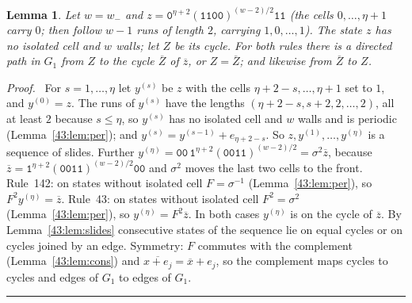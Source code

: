 \documentclass[10pt,a4paper]{article}
\newtheorem{lemma}[theorem]{Lemma}
\newcommand{\qedmark}{\rule{1.1ex}{1.1ex}}
\newenvironment{proof}[1][Proof]{\par\smallskip\noindent\textit{#1.}\ }{\hfill\qedmark\par\smallskip}
\newcommand{\cpl}[1]{\overline{#1}}           %
\newcommand{\Gone}{G_1}                       %
\newcommand{\code}[1]{\mathtt{#1}}            %
\begin{document}
\begin{lemma}\label{43:lem:Z}
Let $w=w_-$ and
$z=\code{0}^{\eta+2}(\code{1100})^{(w-2)/2}\code{11}$ (the cells $0,\dots,\eta+1$ carry $0$; then follow $w-1$
runs of length $2$, carrying $1,0,\dots,1$). The state $z$ has no isolated cell and $w$ walls; let $Z$ be its
cycle. For both rules there is a directed path in $\Gone$ from $Z$ to the cycle $\cpl{Z}$ of $\cpl{z}$, or
$Z=\cpl{Z}$; and likewise from $\cpl{Z}$ to $Z$.
\end{lemma}
\begin{proof}
For $s=1,\dots,\eta$ let $y^{(s)}$ be $z$ with the cells $\eta+2-s,\dots,\eta+1$ set to $1$, and $y^{(0)}=z$. The
runs of $y^{(s)}$ have the lengths $(\eta+2-s,s+2,2,\dots,2)$, all at least $2$ because $s\le\eta$, so $y^{(s)}$
has no isolated cell and $w$ walls and is periodic (Lemma~\ref{43:lem:per}); and
$y^{(s)}=y^{(s-1)}+e_{\eta+2-s}$. So $z,y^{(1)},\dots,y^{(\eta)}$ is a sequence of slides. Further
$y^{(\eta)}=\code{00}\,\code{1}^{\eta+2}(\code{0011})^{(w-2)/2}=\sigma^2\cpl{z}$, because
$\cpl{z}=\code{1}^{\eta+2}(\code{0011})^{(w-2)/2}\code{00}$ and $\sigma^2$ moves the last two cells to the
front. Rule~142: on states without isolated cell $F=\sigma^{-1}$ (Lemma~\ref{43:lem:per}), so
$F^2y^{(\eta)}=\cpl{z}$. Rule~43: on states without isolated cell $F^2=\sigma^2$ (Lemma~\ref{43:lem:per}), so
$y^{(\eta)}=F^2\cpl{z}$. In both cases $y^{(\eta)}$ is on the cycle of $\cpl{z}$. By
Lemma~\ref{43:lem:slides} consecutive states of the sequence lie on equal cycles or on cycles joined by an
edge. Symmetry: $F$ commutes with the complement (Lemma~\ref{43:lem:cons}) and
$\cpl{x+e_j}=\cpl{x}+e_j$, so the complement maps cycles to cycles and edges of $\Gone$ to edges of $\Gone$.
\end{proof}
\end{document}
